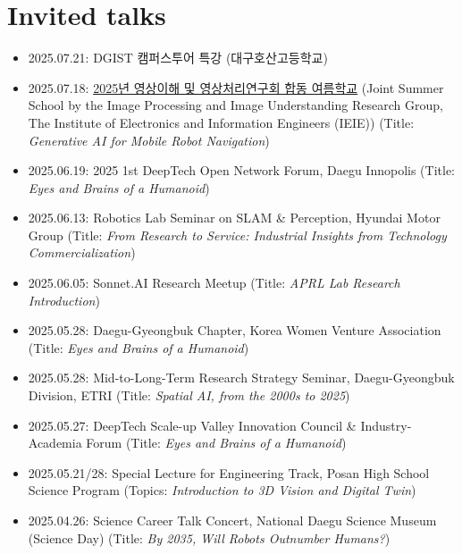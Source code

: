 \section{Invited talks}
\begin{itemize}[label=$\cdot$]
    \item 2025.07.21: DGIST 캠퍼스투어 특강 (대구호산고등학교)   
    \item 2025.07.18: \href{https://www.theieie.org/events/?part=03&c_id=949}{2025년 영상이해 및 영상처리연구회 합동 여름학교} (Joint Summer School by the Image Processing and Image Understanding Research Group, The Institute of Electronics and Information Engineers (IEIE))
    \hfill (Title: \textit{Generative AI for Mobile Robot Navigation})

    \item 2025.06.19: 2025 1st DeepTech Open Network Forum, Daegu Innopolis  
    \hfill (Title: \textit{Eyes and Brains of a Humanoid})
    
    \item 2025.06.13: Robotics Lab Seminar on SLAM \& Perception, Hyundai Motor Group  
    \hfill (Title: \textit{From Research to Service: Industrial Insights from Technology Commercialization})
    
    \item 2025.06.05: Sonnet.AI Research Meetup  
    \hfill (Title: \textit{APRL Lab Research Introduction})
    
    \item 2025.05.28: Daegu-Gyeongbuk Chapter, Korea Women Venture Association  
    \hfill (Title: \textit{Eyes and Brains of a Humanoid})
    
    \item 2025.05.28: Mid-to-Long-Term Research Strategy Seminar, Daegu-Gyeongbuk Division, ETRI  
    \hfill (Title: \textit{Spatial AI, from the 2000s to 2025})
    
    \item 2025.05.27: DeepTech Scale-up Valley Innovation Council \& Industry-Academia Forum  
    \hfill (Title: \textit{Eyes and Brains of a Humanoid})
    
    \item 2025.05.21/28: Special Lecture for Engineering Track, Posan High School Science Program  
    \hfill (Topics: \textit{Introduction to 3D Vision and Digital Twin})
    
    \item 2025.04.26: Science Career Talk Concert, National Daegu Science Museum (Science Day)  
    \hfill (Title: \textit{By 2035, Will Robots Outnumber Humans?})
    

\end{itemize}
